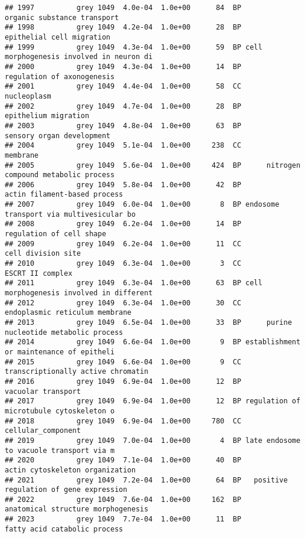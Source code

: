 \documentclass[]{article}
\begin{document}
\begin{verbatim}
## 1997          grey 1049  4.0e-04  1.0e+00      84  BP              organic substance transport
## 1998          grey 1049  4.2e-04  1.0e+00      28  BP                epithelial cell migration
## 1999          grey 1049  4.3e-04  1.0e+00      59  BP cell morphogenesis involved in neuron di
## 2000          grey 1049  4.3e-04  1.0e+00      14  BP               regulation of axonogenesis
## 2001          grey 1049  4.4e-04  1.0e+00      58  CC                              nucleoplasm
## 2002          grey 1049  4.7e-04  1.0e+00      28  BP                     epithelium migration
## 2003          grey 1049  4.8e-04  1.0e+00      63  BP                sensory organ development
## 2004          grey 1049  5.1e-04  1.0e+00     238  CC                                 membrane
## 2005          grey 1049  5.6e-04  1.0e+00     424  BP      nitrogen compound metabolic process
## 2006          grey 1049  5.8e-04  1.0e+00      42  BP             actin filament-based process
## 2007          grey 1049  6.0e-04  1.0e+00       8  BP endosome transport via multivesicular bo
## 2008          grey 1049  6.2e-04  1.0e+00      14  BP                 regulation of cell shape
## 2009          grey 1049  6.2e-04  1.0e+00      11  CC                       cell division site
## 2010          grey 1049  6.3e-04  1.0e+00       3  CC                         ESCRT II complex
## 2011          grey 1049  6.3e-04  1.0e+00      63  BP cell morphogenesis involved in different
## 2012          grey 1049  6.3e-04  1.0e+00      30  CC           endoplasmic reticulum membrane
## 2013          grey 1049  6.5e-04  1.0e+00      33  BP      purine nucleotide metabolic process
## 2014          grey 1049  6.6e-04  1.0e+00       9  BP establishment or maintenance of epitheli
## 2015          grey 1049  6.6e-04  1.0e+00       9  CC       transcriptionally active chromatin
## 2016          grey 1049  6.9e-04  1.0e+00      12  BP                       vacuolar transport
## 2017          grey 1049  6.9e-04  1.0e+00      12  BP regulation of microtubule cytoskeleton o
## 2018          grey 1049  6.9e-04  1.0e+00     780  CC                       cellular_component
## 2019          grey 1049  7.0e-04  1.0e+00       4  BP late endosome to vacuole transport via m
## 2020          grey 1049  7.1e-04  1.0e+00      40  BP          actin cytoskeleton organization
## 2021          grey 1049  7.2e-04  1.0e+00      64  BP   positive regulation of gene expression
## 2022          grey 1049  7.6e-04  1.0e+00     162  BP       anatomical structure morphogenesis
## 2023          grey 1049  7.7e-04  1.0e+00      11  BP             fatty acid catabolic process

\end{verbatim}
\end{document}

